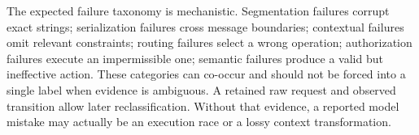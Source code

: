 The expected failure taxonomy is mechanistic. Segmentation failures corrupt exact strings; serialization failures cross message boundaries; contextual failures omit relevant constraints; routing failures select a wrong operation; authorization failures execute an impermissible one; semantic failures produce a valid but ineffective action. These categories can co-occur and should not be forced into a single label when evidence is ambiguous. A retained raw request and observed transition allow later reclassification. Without that evidence, a reported model mistake may actually be an execution race or a lossy context transformation.

